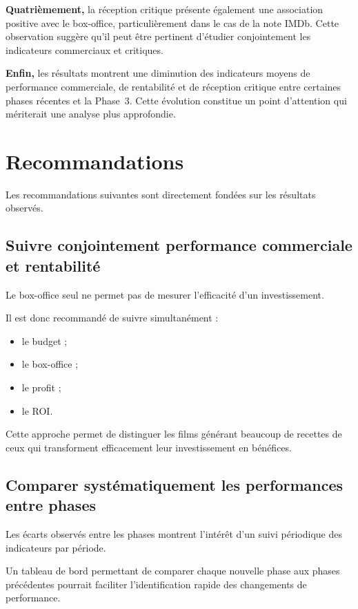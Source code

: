 \documentclass[a4paper,11pt]{article}
\begin{document}
\textbf{Quatrièmement,} la réception critique présente également une
association positive avec le box-office, particulièrement dans le cas de la
note IMDb. Cette observation suggère qu'il peut être pertinent d'étudier
conjointement les indicateurs commerciaux et critiques.

\textbf{Enfin,} les résultats montrent une diminution des indicateurs moyens
de performance commerciale, de rentabilité et de réception critique entre
certaines phases récentes et la Phase~3. Cette évolution constitue un point
d'attention qui mériterait une analyse plus approfondie.

\section{Recommandations}

Les recommandations suivantes sont directement fondées sur les résultats
observés.

\subsection{Suivre conjointement performance commerciale et rentabilité}

Le box-office seul ne permet pas de mesurer l'efficacité d'un investissement.

Il est donc recommandé de suivre simultanément :
\begin{itemize}
  \item le budget ;
  \item le box-office ;
  \item le profit ;
  \item le ROI.
\end{itemize}

Cette approche permet de distinguer les films générant beaucoup de recettes
de ceux qui transforment efficacement leur investissement en bénéfices.

\subsection{Comparer systématiquement les performances entre phases}

Les écarts observés entre les phases montrent l'intérêt d'un suivi périodique
des indicateurs par période.

Un tableau de bord permettant de comparer chaque nouvelle phase aux phases
précédentes pourrait faciliter l'identification rapide des changements de
performance.
\end{document}

